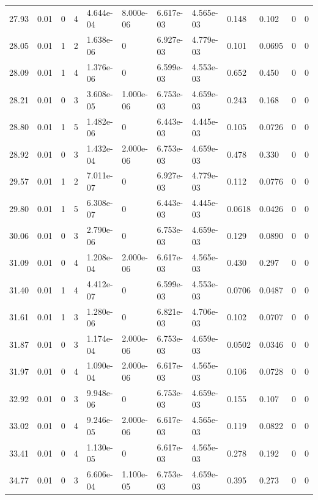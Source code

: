 \documentclass[preview]{standalone}
\begin{document}
{{{\begin{tabular}{L{1.2cm}C{1.2cm} C{0.3cm}C{0.5cm} C{1.4cm}C{1.4cm} C{1.4cm}C{1.4cm} C{1.6cm}C{1.6cm} C{1.6cm}C{1.6cm}}
  27.93  &  0.01  & 0     &  4 &  4.644e-04  & 8.000e-06  &  6.617e-03&   4.565e-03& 0.148 & 0.102   &  0 & 0  \\ 
  28.05  &  0.01  & 1     &  2 &  1.638e-06  & 0  &  6.927e-03&   4.779e-03& 0.101 & 0.0695   &  0 & 0  \\ 
  28.09  &  0.01  & 1     &  4 &  1.376e-06  & 0  &  6.599e-03&   4.553e-03& 0.652 & 0.450   &  0 & 0  \\ 
  28.21  &  0.01  & 0     &  3 &  3.608e-05  & 1.000e-06  &  6.753e-03&   4.659e-03& 0.243 & 0.168   &  0 & 0  \\ 
  28.80  &  0.01  & 1     &  5 &  1.482e-06  & 0  &  6.443e-03&   4.445e-03& 0.105 & 0.0726   &  0 & 0  \\ 
  28.92  &  0.01  & 0     &  3 &  1.432e-04  & 2.000e-06  &  6.753e-03&   4.659e-03& 0.478 & 0.330   &  0 & 0  \\ 
  29.57  &  0.01  & 1     &  2 &  7.011e-07  & 0  &  6.927e-03&   4.779e-03& 0.112 & 0.0776   &  0 & 0  \\ 
  29.80  &  0.01  & 1     &  5 &  6.308e-07  & 0  &  6.443e-03&   4.445e-03& 0.0618 & 0.0426   &  0 & 0  \\ 
  30.06  &  0.01  & 0     &  3 &  2.790e-06  & 0  &  6.753e-03&   4.659e-03& 0.129 & 0.0890   &  0 & 0  \\ 
  31.09  &  0.01  & 0     &  4 &  1.208e-04  & 2.000e-06  &  6.617e-03&   4.565e-03& 0.430 & 0.297   &  0 & 0  \\ 
  31.40  &  0.01  & 1     &  4 &  4.412e-07  & 0  &  6.599e-03&   4.553e-03& 0.0706 & 0.0487   &  0 & 0  \\ 
  31.61  &  0.01  & 1     &  3 &  1.280e-06  & 0  &  6.821e-03&   4.706e-03& 0.102 & 0.0707   &  0 & 0  \\ 
  31.87  &  0.01  & 0     &  3 &  1.174e-04  & 2.000e-06  &  6.753e-03&   4.659e-03& 0.0502 & 0.0346   &  0 & 0  \\ 
  31.97  &  0.01  & 0     &  4 &  1.090e-04  & 2.000e-06  &  6.617e-03&   4.565e-03& 0.106 & 0.0728   &  0 & 0  \\ 
  32.92  &  0.01  & 0     &  3 &  9.948e-06  & 0  &  6.753e-03&   4.659e-03& 0.155 & 0.107   &  0 & 0  \\ 
  33.02  &  0.01  & 0     &  4 &  9.246e-05  & 2.000e-06  &  6.617e-03&   4.565e-03& 0.119 & 0.0822   &  0 & 0  \\ 
  33.41  &  0.01  & 0     &  4 &  1.130e-05  & 0  &  6.617e-03&   4.565e-03& 0.278 & 0.192   &  0 & 0  \\ 
  34.77  &  0.01  & 0     &  3 &  6.606e-04  & 1.100e-05  &  6.753e-03&   4.659e-03& 0.395 & 0.273   &  0 & 0  \\ 

\end{tabular}}}}
\end{document}

